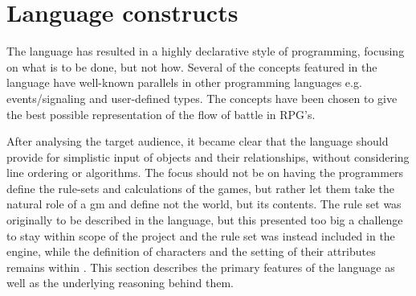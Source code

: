 \section{Language constructs}
The \langname{} language has resulted in a highly declarative style of programming, focusing on
what is to be done, but not how. Several of the concepts featured in the language have well-known
parallels in other programming languages e.g. events/signaling and user-defined types. The
concepts have been chosen to give the best possible representation of the flow of battle in
RPG's.

After analysing the target audience, it became clear that the language should provide for
simplistic input of objects and their relationships, without considering line
ordering or algorithms. The focus should not be on having the programmers define the rule-sets
and calculations of the games, but rather let them take the natural role of a \ac{gm}
and define not the world, but its contents. The rule set was originally to be described in the
language, but this presented too big a challenge to stay within scope of the project and the rule set was instead included in the engine, while the definition of characters and the setting of their attributes remains within \langname{}. This section describes the primary features of the
\langname{} language as well as the underlying reasoning behind them.
